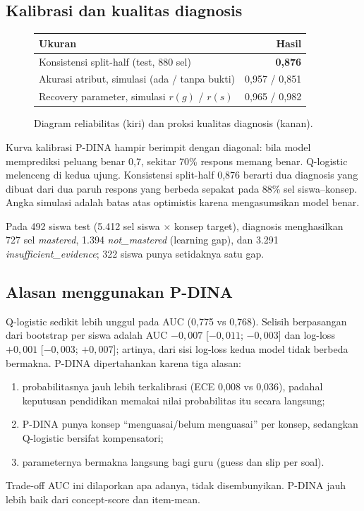 \documentclass[11pt,a4paper]{article}
\begin{document}
\subsection{Kalibrasi dan kualitas diagnosis}

\begin{figure}[h]
  \centering
  \setlength\figH{5.6cm}
  \begin{minipage}{0.5\linewidth}\end{minipage}\hfill
  \begin{minipage}{0.46\linewidth}\small
    \begin{tabularx}{\linewidth}{@{}L r@{}}
      \toprule
      Ukuran & Hasil \\
      \midrule
      Konsistensi split-half (test, 880 sel) & \textbf{0,876} \\
      Akurasi atribut, simulasi (ada / tanpa bukti) & 0,957 / 0,851 \\
      Recovery parameter, simulasi $r(g)$ / $r(s)$ & 0,965 / 0,982 \\
      \bottomrule
    \end{tabularx}
  \end{minipage}
  \caption{Diagram reliabilitas (kiri) dan proksi kualitas diagnosis (kanan).}
\end{figure}

Kurva kalibrasi P-DINA hampir berimpit dengan diagonal: bila model memprediksi peluang benar 0,7, sekitar 70\% respons
memang benar. Q-logistic melenceng di kedua ujung. Konsistensi split-half 0,876 berarti dua diagnosis yang dibuat dari
dua paruh respons yang berbeda sepakat pada 88\% sel siswa--konsep. Angka simulasi adalah batas atas optimistis karena
mengasumsikan model benar.

Pada 492 siswa test (5.412 sel siswa $\times$ konsep target), diagnosis menghasilkan 727 sel \emph{mastered},
1.394 \emph{not\_mastered} (learning gap), dan 3.291 \emph{insufficient\_evidence}; 322 siswa punya setidaknya satu
gap.

\subsection{Alasan menggunakan P-DINA}

Q-logistic sedikit lebih unggul pada AUC (0,775 vs 0,768). Selisih berpasangan dari bootstrap per siswa adalah AUC
$-0{,}007$ [$-0{,}011$; $-0{,}003$] dan log-loss $+0{,}001$ [$-0{,}003$; $+0{,}007$]; artinya, dari sisi log-loss
kedua model tidak berbeda bermakna. P-DINA dipertahankan karena tiga alasan:
\begin{enumerate}
  \item probabilitasnya jauh lebih terkalibrasi (ECE 0,008 vs 0,036), padahal keputusan pendidikan memakai nilai
        probabilitas itu secara langsung;
  \item P-DINA punya konsep ``menguasai/belum menguasai'' per konsep, sedangkan Q-logistic bersifat kompensatori;
  \item parameternya bermakna langsung bagi guru (guess dan slip per soal).
\end{enumerate}
Trade-off AUC ini dilaporkan apa adanya, tidak disembunyikan. P-DINA jauh lebih baik dari concept-score dan
item-mean.
\end{document}
